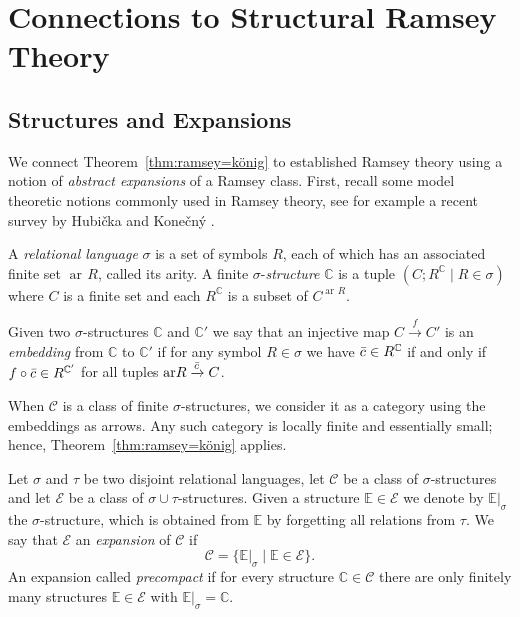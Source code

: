 \documentclass[preprint,12pt]{elsarticle}
\newcommand{\cat}[1]{\mathcal{#1}}
\newcommand{\str}[1]{\mathbb{#1}}
\DeclareMathOperator{\ar}{ar\!}
\begin{document}
\section{Connections to Structural Ramsey Theory}
\label{sec:structures}




\subsection{Structures and Expansions}
We connect Theorem~\ref{thm:ramsey=könig} to established Ramsey theory using a notion of \emph{abstract expansions} of a Ramsey class. First, recall some model theoretic notions commonly used in Ramsey theory, see for example a recent survey by Hubi\v cka and Kone\v cn\'y \cite{hubivcka2025twenty}.

\begin{defin}
    A \emph{relational language} $\sigma$ is a set of symbols $R$, each of which has an associated finite set $\ar R$, called its arity. A finite $\sigma$-\emph{structure} $\str C$ is a tuple $(C; R^\str C \mid R\in\sigma)$ where $C$ is a finite set and each $R^{\str C}$ is a subset of $C^{\ar R}$. 
    
    Given two $\sigma$-structures $\str C$ and $\str C'$ we say that an injective map $C\xrightarrow{f} C'$ is an \emph{embedding} from $\str C$ to $\str C'$ if for any symbol $R\in\sigma$ we have $\Bar{c}\in R^{\str C}$ if and only if $f\circ\Bar{c}\in R^{\str C'}$ for all tuples $\ar R\xrightarrow{\Bar{c}}C$. 
    
    When $\cat C$ is a class of finite $\sigma$-structures, we consider it as a category using the embeddings as arrows. Any such category is locally finite and essentially small; hence, Theorem~\ref{thm:ramsey=könig} applies.
\end{defin}


\begin{defin}
\label{def:expansionExplicit}
    Let $\sigma$ and $\tau$ be two disjoint relational languages, let $\cat C$ be a class of $\sigma$-structures and let $\cat E$ be a class of $\sigma\cup\tau$-structures. Given a structure $\str E\in\cat E$ we denote by $\str E|_\sigma$ the $\sigma$-structure, which is obtained from $\str E$ by forgetting all relations from $\tau$. We say that $\cat E$ an \emph{expansion} of $\cat C$ if 
        $$
        \cat C = \{ \str E|_\sigma\mid \str E\in\cat E\}.
        $$ 
    An expansion called \emph{precompact} if for every structure $\str C\in\cat C$ there are only finitely many structures $\str E\in\cat E$ with $\str E|_{\sigma}= \str C$.
\end{defin}
\end{document}
